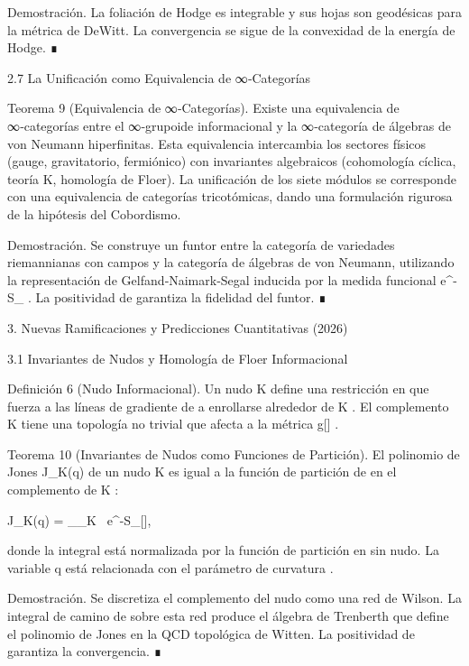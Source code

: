 \documentclass[12pt,a4paper]{book}
\begin{document}
Demostración. La foliación de Hodge es integrable y sus hojas son geodésicas para la métrica de DeWitt. La convergencia se sigue de la convexidad de la energía de Hodge. ∎

2.7 La Unificación como Equivalencia de ∞‑Categorías

Teorema 9 (Equivalencia de ∞‑Categorías). Existe una equivalencia de ∞‑categorías entre el ∞‑grupoide informacional    y la ∞‑categoría de álgebras de von Neumann hiperfinitas. Esta equivalencia intercambia los sectores físicos (gauge, gravitatorio, fermiónico) con invariantes algebraicos (cohomología cíclica, teoría K, homología de Floer). La unificación de los siete módulos se corresponde con una equivalencia de categorías tricotómicas, dando una formulación rigurosa de la hipótesis del Cobordismo.

Demostración. Se construye un funtor entre la categoría de variedades riemannianas con campos  \rho  y la categoría de álgebras de von Neumann, utilizando la representación de Gelfand‑Naimark‑Segal inducida por la medida funcional  e^{-S_{}} . La positividad de  \rho  garantiza la fidelidad del funtor. ∎

3. Nuevas Ramificaciones y Predicciones Cuantitativas (2026)

3.1 Invariantes de Nudos y Homología de Floer Informacional

Definición 6 (Nudo Informacional). Un nudo  K \subset {}  define una restricción en  \rho  que fuerza a las líneas de gradiente de  \rho  a enrollarse alrededor de  K . El complemento  \setminus K  tiene una topología no trivial que afecta a la métrica  g[\rho] .

Teorema 10 (Invariantes de Nudos como Funciones de Partición). El polinomio de Jones  J_K(q)  de un nudo  K  es igual a la función de partición de  \rho  en el complemento de  K :

J_K(q) = \int_{_{\setminus K}} \rho \, e^{-S_{}[\rho]},

donde la integral está normalizada por la función de partición en    sin nudo. La variable  q  está relacionada con el parámetro de curvatura  \kappa .

Demostración. Se discretiza el complemento del nudo como una red de Wilson. La integral de camino de  \rho  sobre esta red produce el álgebra de Trenberth que define el polinomio de Jones en la QCD topológica de Witten. La positividad de  \rho  garantiza la convergencia. ∎
\end{document}
